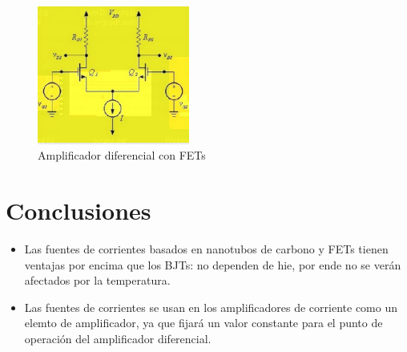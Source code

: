 \documentclass[conference]{IEEEtran} %
\begin{document}
			\begin{figure}[!ht]
				\centering
				\includegraphics[width=5cm]{IMAGENES/image5.png}
				\caption{Amplificador diferencial con FETs}
			\end{figure}




	\section{Conclusiones}
	

				\begin{itemize}
					\item Las fuentes de corrientes   basados en nanotubos de carbono y FETs tienen ventajas por encima que los BJTs: no dependen de hie, por ende no se verán afectados por la temperatura.
					\item Las fuentes de corrientes se usan en los amplificadores de corriente como un elemto de amplificador, ya que fijará un valor constante para el punto de operación del amplificador diferencial.
				\end{itemize}





 




\end{document}

